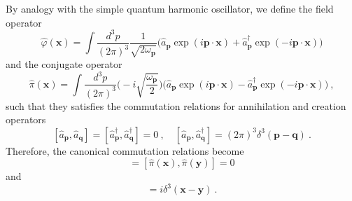     By analogy with the simple quantum harmonic oscillator, we define the field operator 
    \begin{equation}\label{kgfop}
        \hat \varphi (\mathbf x) = \int \frac{d^3 p}{{(2\pi)}^3} \frac{1}{\sqrt{2 \omega_{\mathbf p}}} \Big (\hat a_{\mathbf p} \exp(i \mathbf p \cdot \mathbf x) + \hat a_{\mathbf p}^\dagger \exp(- i \mathbf p \cdot \mathbf x) \Big)
    \end{equation}
    and the conjugate operator
    \begin{equation}\label{kgpop}
        \hat \pi (\mathbf x) = \int \frac{d^3 p}{{(2\pi)}^3} \Big (- i\sqrt{\frac{\omega_{\mathbf p}}{2}} \Big ) \Big (\hat a_{\mathbf p} \exp(i \mathbf p \cdot \mathbf x) - \hat a_{\mathbf p}^\dagger \exp(- i \mathbf p \cdot \mathbf x) \Big) ~,
    \end{equation}
    such that they satisfies the commutation relations for annihilation and creation operators
    \begin{equation}\label{anncrea}
        [\hat a_{\mathbf p}, \hat a_{\mathbf q}] = [\hat a_{\mathbf p}^\dagger, \hat a_{\mathbf q}^\dagger] = 0 ~, \quad [\hat a_{\mathbf p}, \hat a_{\mathbf q}^\dagger] = (2\pi)^3 \delta^3 (\mathbf p - \mathbf q) ~.
    \end{equation}
    Therefore, the canonical commutation relations become 
    \begin{equation*}
        [\hat \varphi(\mathbf x), \hat \varphi (\mathbf y)] = [\hat \pi(\mathbf x), \hat \pi (\mathbf y)]  = 0
    \end{equation*}
    and 
    \begin{equation*}
        [\hat \varphi(\mathbf x), \hat \pi (\mathbf y)] = i \delta^3 (\mathbf x - \mathbf y) ~.
    \end{equation*}
